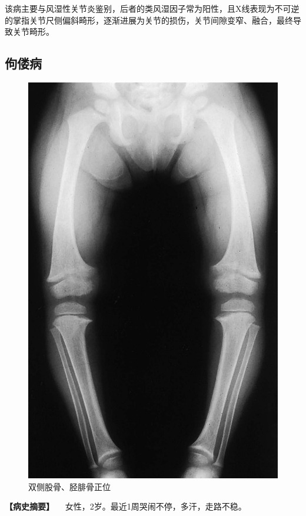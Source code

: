 该病主要与风湿性关节炎鉴别，后者的类风湿因子常为阳性，且X线表现为不可逆的掌指关节尺侧偏斜畸形，逐渐进展为关节的损伤，关节间隙变窄、融合，最终导致关节畸形。

\subsection{佝偻病}

\begin{figure}[!htbp]
 \centering
 \includegraphics{./images/Image00122.jpg}
 \captionsetup{justification=centering}
 \caption{双侧股骨、胫腓骨正位}
 \label{fig2-8-8}
  \end{figure} 

\textbf{【病史摘要】} 　女性，2岁。最近1周哭闹不停，多汗，走路不稳。

